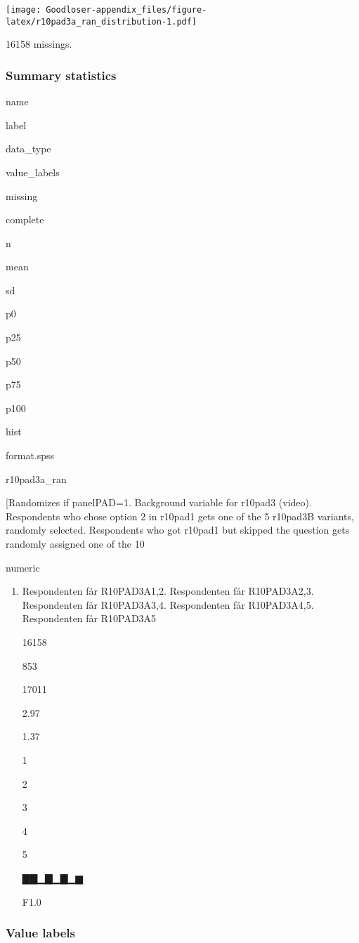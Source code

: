 \documentclass[]{book}
\providecommand{\tightlist}{%
  \setlength{\itemsep}{0pt}\setlength{\parskip}{0pt}}
\begin{document}
\texttt{[image: Goodloser-appendix\_files/figure-latex/r10pad3a\_ran\_distribution-1.pdf]}

16158 missings.

\subsubsection{Summary statistics}\label{r10pad3a_ran_summary}

name

label

data\_type

value\_labels

missing

complete

n

mean

sd

p0

p25

p50

p75

p100

hist

format.spss

r10pad3a\_ran

{[}Randomizes if panelPAD=1. Background variable for r10pad3 (video).
Respondents who chose option 2 in r10pad1 gets one of the 5 r10pad3B
variants, randomly selected. Respondents who got r10pad1 but skipped the
question gets randomly assigned one of the 10

numeric

\begin{enumerate}
\def\labelenumi{\arabic{enumi}.}
\tightlist
\item
  Respondenten får R10PAD3A1,2. Respondenten får R10PAD3A2,3.
  Respondenten får R10PAD3A3,4. Respondenten får R10PAD3A4,5.
  Respondenten får R10PAD3A5

  16158

  853

  17011

  2.97

  1.37

  1

  2

  3

  4

  5

  ▇▇▁▇▁▇▁▆

  F1.0
\end{enumerate}

\subsubsection{Value labels}\label{r10pad3a_ran_labels}
\end{document}
